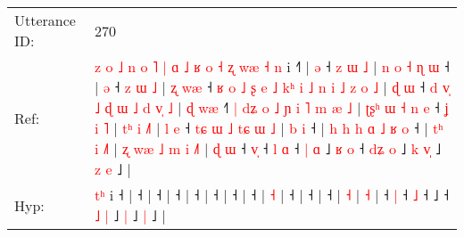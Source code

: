 \documentclass[10pt]{article}
\DeclareRobustCommand{\hl}[1]{{\textcolor{red}{#1}}}
\begin{document}
\begin{longtable}{ll}
 \\
\midrule
Utterance ID: & 270 \\
Ref: & \hl{z}\hl{ }\hl{o}\hl{ }\hl{˩}\hl{ }\hl{n}\hl{ }\hl{o}\hl{ }\hl{˥}\hl{ }\hl{|}\hl{ }\hl{ɑ}\hl{ }\hl{˩}\hl{ }\hl{ʁ}\hl{ }\hl{o}\hl{ }\hl{˧}\hl{ }\hl{ʐ}\hl{ }\hl{w}\hl{æ}\hl{ }\hl{˧}\hl{ }\hl{n} i ˧\hl{˥} |\hl{ }\hl{ə} ˧\hl{ }\hl{z}\hl{ }\hl{ɯ}\hl{ }\hl{˩} |\hl{ }\hl{n}\hl{ }\hl{o}\hl{ }\hl{˧}\hl{ }\hl{ɳ}\hl{ }\hl{ɯ} ˧ |\hl{ }\hl{ə} ˧\hl{ }\hl{z}\hl{ }\hl{ɯ}\hl{ }\hl{˩} |\hl{ }\hl{ʐ}\hl{ }\hl{w}\hl{æ} ˧\hl{ }\hl{ʁ}\hl{ }\hl{o}\hl{ }\hl{˩}\hl{ }\hl{ʂ}\hl{ }\hl{e}\hl{ }\hl{˩}\hl{ }\hl{k}\hl{ʰ}\hl{ }\hl{i}\hl{ }\hl{˩}\hl{ }\hl{n}\hl{ }\hl{i}\hl{ }\hl{˩}\hl{ }\hl{z}\hl{ }\hl{o}\hl{ }\hl{˩} |\hl{ }\hl{ɖ}\hl{ }\hl{ɯ} ˧\hl{ }\hl{d}\hl{ }\hl{v}\hl{̩}\hl{ }\hl{˩}\hl{ }\hl{ɖ}\hl{ }\hl{ɯ}\hl{ }\hl{˩}\hl{ }\hl{d}\hl{ }\hl{v}\hl{̩}\hl{ }\hl{˩} |\hl{ }\hl{ɖ}\hl{ }\hl{w}\hl{æ} ˧\hl{˥}\hl{ }\hl{|}\hl{ }\hl{d}\hl{ʑ}\hl{ }\hl{o}\hl{ }\hl{˩}\hl{ }\hl{ɲ}\hl{ }\hl{i}\hl{ }\hl{˥}\hl{ }\hl{m}\hl{ }\hl{æ}\hl{ }\hl{˩} |\hl{ }\hl{ʈ}\hl{ʂ}\hl{ʰ}\hl{ }\hl{ɯ}\hl{ }\hl{˧}\hl{ }\hl{n}\hl{ }\hl{e} ˧\hl{ }\hl{ʝ}\hl{ }\hl{i}\hl{ }\hl{˥} |\hl{ }\hl{t}\hl{ʰ}\hl{ }\hl{i} \hl{˩}\hl{˥} |\hl{ }\hl{l}\hl{ }\hl{e} ˧\hl{ }\hl{t}\hl{ɕ}\hl{ }\hl{ɯ}\hl{ }\hl{˩}\hl{ }\hl{t}\hl{ɕ}\hl{ }\hl{ɯ}\hl{ }\hl{˩} |\hl{ }\hl{b}\hl{ }\hl{i} ˧ |\hl{ }\hl{h}\hl{ }\hl{h}\hl{ }\hl{h}\hl{ }\hl{ɑ}\hl{ }\hl{˩}\hl{ }\hl{ʁ}\hl{ }\hl{o} ˧ |\hl{ }\hl{t}\hl{ʰ}\hl{ }\hl{i} \hl{˩}\hl{˥} |\hl{ }\hl{ʐ}\hl{ }\hl{w}\hl{æ}\hl{ }\hl{˩}\hl{ }\hl{m}\hl{ }\hl{i} \hl{˩}\hl{˥} |\hl{ }\hl{ɖ}\hl{ }\hl{ɯ} ˧ \hl{v}\hl{̩} ˧\hl{ }\hl{l} \hl{ɑ} ˧\hl{ }\hl{|}\hl{ }\hl{ɑ} ˩\hl{ }\hl{ʁ}\hl{ }\hl{o} ˧ \hl{d}\hl{ʑ} \hl{o} ˩\hl{ }\hl{k} \hl{v}\hl{̩} ˩\hl{ }\hl{z} \hl{e} ˩ |
 \\
Hyp: & \hl{}\hl{}\hl{}\hl{}\hl{}\hl{}\hl{}\hl{}\hl{}\hl{}\hl{}\hl{}\hl{}\hl{}\hl{}\hl{}\hl{}\hl{}\hl{}\hl{}\hl{}\hl{}\hl{}\hl{}\hl{}\hl{}\hl{}\hl{}\hl{}\hl{}\hl{t}\hl{ʰ} i ˧\hl{} |\hl{}\hl{} ˧\hl{}\hl{}\hl{}\hl{}\hl{}\hl{} |\hl{}\hl{}\hl{}\hl{}\hl{}\hl{}\hl{}\hl{}\hl{}\hl{} ˧ |\hl{}\hl{} ˧\hl{}\hl{}\hl{}\hl{}\hl{}\hl{} |\hl{}\hl{}\hl{}\hl{}\hl{} ˧\hl{}\hl{}\hl{}\hl{}\hl{}\hl{}\hl{}\hl{}\hl{}\hl{}\hl{}\hl{}\hl{}\hl{}\hl{}\hl{}\hl{}\hl{}\hl{}\hl{}\hl{}\hl{}\hl{}\hl{}\hl{}\hl{}\hl{}\hl{}\hl{}\hl{}\hl{} |\hl{}\hl{}\hl{}\hl{} ˧\hl{}\hl{}\hl{}\hl{}\hl{}\hl{}\hl{}\hl{}\hl{}\hl{}\hl{}\hl{}\hl{}\hl{}\hl{}\hl{}\hl{}\hl{}\hl{}\hl{} |\hl{}\hl{}\hl{}\hl{}\hl{} ˧\hl{}\hl{}\hl{}\hl{}\hl{}\hl{}\hl{}\hl{}\hl{}\hl{}\hl{}\hl{}\hl{}\hl{}\hl{}\hl{}\hl{}\hl{}\hl{}\hl{}\hl{}\hl{} |\hl{}\hl{}\hl{}\hl{}\hl{}\hl{}\hl{}\hl{}\hl{}\hl{}\hl{}\hl{} ˧\hl{}\hl{}\hl{}\hl{}\hl{}\hl{} |\hl{}\hl{}\hl{}\hl{}\hl{} \hl{}\hl{˧} |\hl{}\hl{}\hl{}\hl{} ˧\hl{}\hl{}\hl{}\hl{}\hl{}\hl{}\hl{}\hl{}\hl{}\hl{}\hl{}\hl{}\hl{}\hl{} |\hl{}\hl{}\hl{}\hl{} ˧ |\hl{}\hl{}\hl{}\hl{}\hl{}\hl{}\hl{}\hl{}\hl{}\hl{}\hl{}\hl{}\hl{}\hl{} ˧ |\hl{}\hl{}\hl{}\hl{}\hl{} \hl{}\hl{˧} |\hl{}\hl{}\hl{}\hl{}\hl{}\hl{}\hl{}\hl{}\hl{}\hl{}\hl{} \hl{}\hl{˧} |\hl{}\hl{}\hl{}\hl{} ˧ \hl{}\hl{|} ˧\hl{}\hl{} \hl{˩} ˧\hl{}\hl{}\hl{}\hl{} ˩\hl{}\hl{}\hl{}\hl{} ˧ \hl{}\hl{˩} \hl{|} ˩\hl{}\hl{} \hl{}\hl{|} ˩\hl{}\hl{} \hl{|} ˩ |

\end{longtable}
\end{document}
